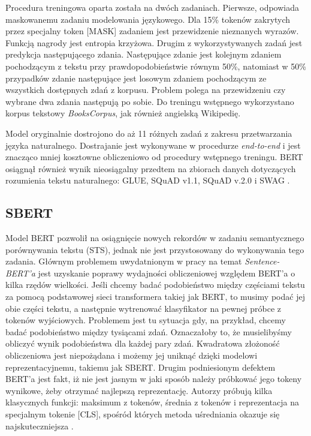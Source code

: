 Procedura treningowa oparta została na dwóch zadaniach. Pierwsze, odpowiada maskowanemu zadaniu modelowania językowego. Dla 15\% tokenów zakrytych przez specjalny token [MASK] zadaniem jest przewidzenie nieznanych wyrazów. Funkcją nagrody jest entropia krzyżowa. Drugim z wykorzystywanych zadań jest predykcja następującego zdania. Następujące zdanie jest kolejnym zdaniem pochodzącym z tekstu przy prawdopodobieństwie równym 50\%, natomiast w 50\% przypadków zdanie następujące jest losowym zdaniem pochodzącym ze wszystkich dostępnych zdań z korpusu. Problem polega na przewidzeniu czy wybrane dwa zdania następują po sobie. Do treningu wstępnego wykorzystano korpus tekstowy \emph{BooksCorpus}, jak również angielską Wikipedię.\newline

Model oryginalnie dostrojono do aż 11 różnych zadań z zakresu przetwarzania języka naturalnego. Dostrajanie jest wykonywane w procedurze \emph{end-to-end} i jest znacząco mniej kosztowne obliczeniowo od procedury wstępnego treningu. BERT osiągnął również wynik nieosiągalny przedtem na zbiorach danych dotyczących rozumienia tekstu naturalnego: GLUE, SQuAD v1.1, SQuAD v.2.0 i SWAG \autocite{devlin2018bert}.\newline

\subsection{SBERT}

Model BERT pozwolił na osiągnięcie nowych rekordów w zadaniu semantycznego porównywania tekstu (STS), jednak nie jest przystosowany do wykonywania tego zadania. Głównym problemem uwydatnionym w pracy na temat \emph{Sentence-BERT'a} jest uzyskanie poprawy wydajności obliczeniowej względem BERT'a o kilka rzędów wielkości. Jeśli chcemy badać podobieństwo między częściami tekstu za pomocą podstawowej sieci transformera takiej jak BERT, to musimy podać jej obie części tekstu, a następnie wytrenować klasyfikator na pewnej próbce z tokenów wyjściowych. Problemem jest tu sytuacja gdy, na przykład, chcemy badać podobieństwo między tysiącami zdań. Oznaczałoby to, że musielibyśmy obliczyć wynik podobieństwa dla każdej pary zdań. Kwadratowa złożoność obliczeniowa jest niepożądana i możemy jej uniknąć dzięki modelowi reprezentacyjnemu, takiemu jak SBERT. Drugim podniesionym defektem BERT'a jest fakt, iż nie jest jasnym w jaki sposób należy próbkować jego tokeny wynikowe, żeby otrzymać najlepszą reprezentację. Autorzy próbują kilka klasycznych funkcji: maksimum z tokenów, średnia z tokenów i reprezentacja na specjalnym tokenie [CLS], spośród których metoda uśredniania okazuje się najskuteczniejsza \autocite{reimers2019sentence}.\newline

